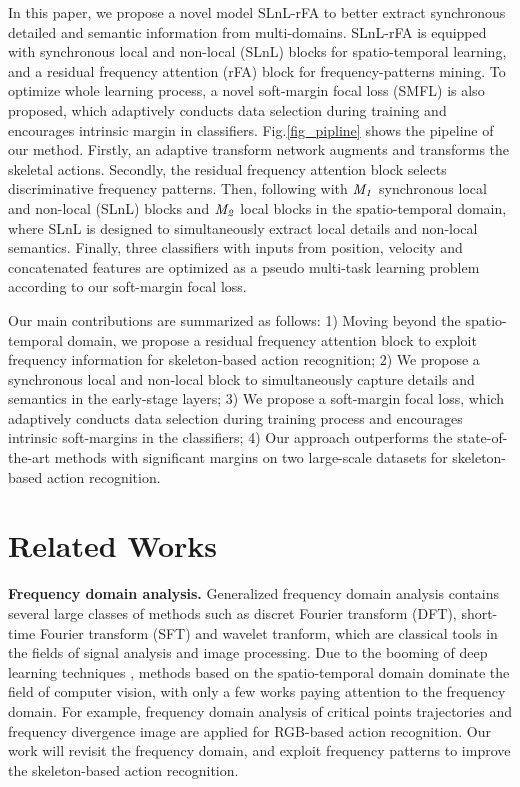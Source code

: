 \documentclass{article}
\begin{document}
In this paper, we propose a novel model SLnL-rFA to better extract synchronous detailed and semantic information from multi-domains. SLnL-rFA is equipped with synchronous local and non-local (SLnL) blocks for spatio-temporal learning, and a residual frequency attention (rFA) block for frequency-patterns mining. To optimize whole learning process, a novel soft-margin focal loss (SMFL) is also proposed, which adaptively conducts data selection during training and encourages intrinsic margin in classifiers. Fig.\ref{fig_pipline} shows the pipeline of our method. Firstly, an adaptive transform network augments and transforms the skeletal actions. Secondly, the residual frequency attention block selects discriminative frequency patterns. Then, following with $ \it{M}_1 $ synchronous local and non-local (SLnL) blocks and $ \it{M}_2 $ local blocks in the spatio-temporal domain, where SLnL is designed to simultaneously extract local details and non-local semantics. Finally, three classifiers with inputs from position, velocity and concatenated features are optimized as a pseudo
multi-task learning problem according to our soft-margin focal loss.

Our main contributions are summarized as follows: 1) Moving beyond the spatio-temporal domain, we propose a residual frequency attention block to exploit frequency information for skeleton-based action recognition; 2) We propose a synchronous local and non-local block to simultaneously capture details and semantics in the early-stage layers; 3) We propose a soft-margin focal loss, which adaptively conducts data selection during training process and encourages intrinsic soft-margins in the classifiers; 4) Our approach outperforms the state-of-the-art methods with significant margins on two large-scale datasets for skeleton-based action recognition.




\section{Related Works}
\textbf{Frequency domain analysis.}
Generalized frequency domain analysis contains several large classes of methods such as discret Fourier transform (DFT), short-time Fourier transform (SFT) and wavelet tranform, which are classical tools in the fields of signal analysis and image processing. Due to the booming of deep learning techniques \cite{DBLP:conf/nips/KrizhevskySH12,DBLP:conf/cvpr/HeZRS16}, methods based on the spatio-temporal domain dominate the field of computer vision, with only a few works paying attention to the frequency domain. For example, frequency domain analysis of critical points trajectories \cite{DBLP:conf/icip/BeaudryPM14} and frequency divergence image \cite{DBLP:conf/isbi/CruzS17} are applied for RGB-based action recognition. Our work will revisit the frequency domain, and exploit frequency patterns to improve the skeleton-based action recognition.
\end{document}
